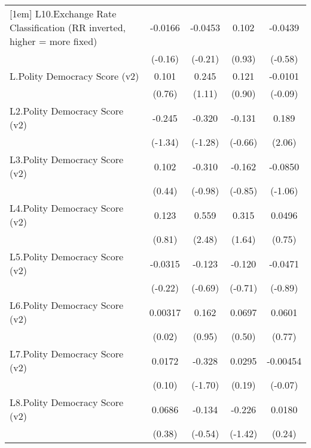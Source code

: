 {\begin{tabular}{l*{4}{c}}
[1em]
L10.Exchange Rate Classification (RR inverted, higher = more fixed)&  -0.0166         &  -0.0453         &    0.102         &  -0.0439         \\
                &  (-0.16)         &  (-0.21)         &   (0.93)         &  (-0.58)         \\
[1em]
L.Polity Democracy Score (v2)&    0.101         &    0.245         &    0.121         &  -0.0101         \\
                &   (0.76)         &   (1.11)         &   (0.90)         &  (-0.09)         \\
[1em]
L2.Polity Democracy Score (v2)&   -0.245         &   -0.320         &   -0.131         &    0.189\sym{*}  \\
                &  (-1.34)         &  (-1.28)         &  (-0.66)         &   (2.06)         \\
[1em]
L3.Polity Democracy Score (v2)&    0.102         &   -0.310         &   -0.162         &  -0.0850         \\
                &   (0.44)         &  (-0.98)         &  (-0.85)         &  (-1.06)         \\
[1em]
L4.Polity Democracy Score (v2)&    0.123         &    0.559\sym{*}  &    0.315         &   0.0496         \\
                &   (0.81)         &   (2.48)         &   (1.64)         &   (0.75)         \\
[1em]
L5.Polity Democracy Score (v2)&  -0.0315         &   -0.123         &   -0.120         &  -0.0471         \\
                &  (-0.22)         &  (-0.69)         &  (-0.71)         &  (-0.89)         \\
[1em]
L6.Polity Democracy Score (v2)&  0.00317         &    0.162         &   0.0697         &   0.0601         \\
                &   (0.02)         &   (0.95)         &   (0.50)         &   (0.77)         \\
[1em]
L7.Polity Democracy Score (v2)&   0.0172         &   -0.328         &   0.0295         & -0.00454         \\
                &   (0.10)         &  (-1.70)         &   (0.19)         &  (-0.07)         \\
[1em]
L8.Polity Democracy Score (v2)&   0.0686         &   -0.134         &   -0.226         &   0.0180         \\
                &   (0.38)         &  (-0.54)         &  (-1.42)         &   (0.24)         \\

\end{tabular}}
